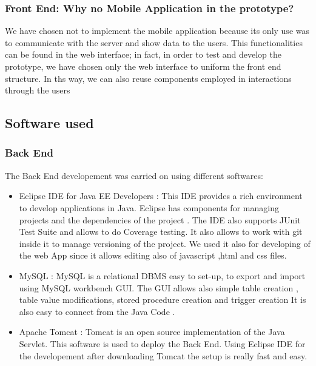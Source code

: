 \subsubsection{Front End: Why no Mobile Application in the prototype?}
We have chosen not to implement the mobile application because its only use was to communicate with the server and show data to the users. This functionalities can be found in the web interface; in fact, in order to test and develop the prototype, we have chosen only the web interface to uniform the front end structure. In ths way, we can also reuse components employed in interactions through the users

\subsection{Software used}
\subsubsection{Back End}
The Back End developement was carried on using different softwares:
\begin{itemize}
\item Eclipse IDE for Java EE Developers :  This IDE provides a rich environment to develop applications in Java. Eclipse has components for managing projects and the dependencies of the project . The IDE also supports JUnit Test Suite and allows to do Coverage testing.
It also allows to work with git inside it to manage versioning of the project.
We used it also for developing of the web App since it allows editing also of javascript ,html and css files.
\item MySQL : MySQL is a relational DBMS easy to set-up, to export and import using MySQL workbench GUI.
				The GUI allows also simple table creation , table value modifications, stored procedure creation and trigger creation
				It is also easy to connect from the Java Code .
\item Apache Tomcat : Tomcat  is an open source implementation of the Java Servlet. This software is used to deploy the Back End.
						Using Eclipse IDE for the developement after downloading Tomcat the setup is really fast and easy.
\end{itemize}
